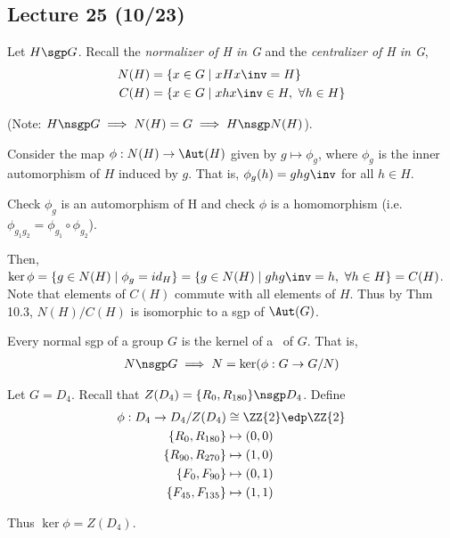 \subsection*{Lecture 25 (10/23)} %

\begin{example}[N/C Theorem] Let \(H\sgp G\). Recall the \emph{normalizer of H in G} and the \emph{centralizer of H in G}, \begin{align*}
    N(H)&=\{x\in G \mid xHx\inv=H\} \\
    C(H)&=\{x\in G \mid xhx\inv \in H,\ \forall h\in H\}
\end{align*}

(Note: \(H\nsgp G \implies N(H)=G \implies H\nsgp N(H)\)).

Consider the map \(\phi: N(H)\to \Aut(H)\) given by \(g\mapsto \phi_g\), where \(\phi_g\) is the inner automorphism of \(H\) induced by \(g\). That is, \(\phi_g(h)=ghg\inv \) for all \(h\in H\).\\

\begin{exercise}
    Check \(\phi_g\) is an automorphism of H and check \(\phi\) is a homomorphism (i.e. \(\phi_{g_1g_2}=\phi_{g_1}\circ\phi_{g_2}\)).
\end{exercise}

Then, \(\ker\phi = \{g\in N(H) \mid\phi_g=id_H\} = \{g\in N(H) \mid ghg\inv=h,\ \forall h\in H\}= C(H)\). Note that elements of \(C(H)\) commute with all elements of \(H\). Thus by Thm 10.3, \(N(H)/C(H)\) is isomorphic to a sgp of \(\Aut(G)\).
\end{example}

\begin{theorem}
    Every normal sgp of a group \(G\) is the kernel of a \homo\ of \(G\). That is,
    \begin{align*}
        N\nsgp G \implies N = \ker(\phi:G\to G/N)
    \end{align*}
\end{theorem}

\begin{example}
    Let \(G = D_4\). Recall that \(Z(D_4)=\{R_0, R_{180}\}\nsgp D_4\). Define
    \begin{align*}
        \phi: D_4 \to D_4/Z(D_4)&\cong \ZZ{2} \edp \ZZ{2} \\
        \{R_0, R_{180}\}&\mapsto (0,0) \\
        \{R_{90}, R_{270}\}&\mapsto (1,0) \\
        \{F_0, F_{90}\}&\mapsto (0,1) \\
        \{F_{45}, F_{135}\}&\mapsto (1,1) \\
    \end{align*}

    Thus \(\ker\phi = Z(D_4)\).
\end{example}

